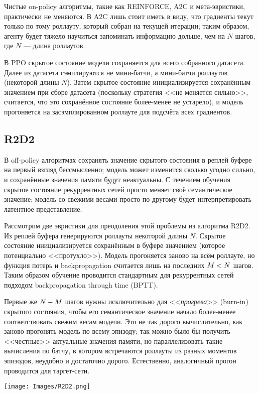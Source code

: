Чистые on-policy алгоритмы, такие как REINFORCE, A2C и мета-эвристики, практически не меняются. В A2C лишь стоит иметь в виду, что градиенты текут только по тому роллауту, который собран на текущей итерации; таким образом, агенту будет тяжело научиться запоминать информацию дольше, чем на $N$ шагов, где $N$ --- длина роллаутов.

В PPO скрытое состояние модели сохраняется для всего собранного датасета. Далее из датасета сэмплируются не мини-батчи, а мини-батчи роллаутов (некоторой длины $N$). Затем скрытое состояние инициализируется сохранённым значением при сборе датасета (поскольку стратегия <<не меняется сильно>>, считается, что это сохранённое состояние более-менее не устарело), и модель прогоняется на засэмплированном роллауте для подсчёта всех градиентов.

\subsection{R2D2}

В off-policy алгоритмах сохранять значение скрытого состояния в реплей буфере на первый взгляд бессмысленно; модель может изменится сколько угодно сильно, и сохранённые значения памяти будут неактуальны. С течением обучения скрытое состояние рекуррентных сетей просто меняет своё семантическое значение: модель со свежими весами просто по-другому будет интерпретировать латентное представление.

Рассмотрим две эвристики для преодоления этой проблемы из алгоритма R2D2. Из реплей буфера генерируются роллауты некоторой длины $N$. Скрытое состояние инициализируется сохранённым в буфере значением (которое потенциально <<протухло>>). Модель прогоняется заново на всём роллауте, но функция потерь и backpropagation считается лишь на последних $M \HM< N$ шагов. Таким образом обучение проводится стандартным для рекуррентных сетей подходом backpropagation through time (BPTT).

Первые же $N \HM- M$ шагов нужны исключительно для <<\emph{прогрева}>> (burn-in) скрытого состояния, чтобы его семантическое значение начало более-менее соответствовать свежим весам модели. Это не так дорого вычислительно, как заново прогонять модель по всему эпизоду; так можно было бы получить <<честные>> актуальные значения памяти, но параллелизовать такие вычисления по батчу, в котором встречаются роллауты из разных моментов эпизодов, неудобно и достаточно дорого. Естественно, аналогичный прогон проводится для таргет-сети.

\begin{center}
    \texttt{[image: Images/R2D2.png]}
\end{center}


